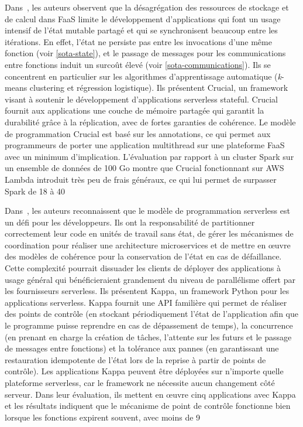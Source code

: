Dans~\cite{Pons2019OnTF}, les auteurs observent que la désagrégation des ressources de stockage et de calcul dans FaaS limite le développement d'applications qui font un usage intensif de l'état mutable partagé et qui se synchronisent beaucoup entre les itérations. En effet, l'état ne persiste pas entre les invocations d'une même fonction (voir \ref{sota-state}), et le passage de messages pour les communications entre fonctions induit un surcoût élevé (voir \ref{sota-communications}). Ils se concentrent en particulier sur les algorithmes d'apprentissage automatique (\textit{k}-means clustering et régression logistique). Ils présentent Crucial, un framework visant à soutenir le développement d'applications serverless stateful. Crucial fournit aux applications une couche de mémoire partagée qui garantit la durabilité grâce à la réplication, avec de fortes garanties de cohérence. Le modèle de programmation Crucial est basé sur les annotations, ce qui permet aux programmeurs de porter une application multithread sur une plateforme FaaS avec un minimum d'implication. L'évaluation par rapport à un cluster Spark sur un ensemble de données de 100 Go montre que Crucial fonctionnant sur AWS Lambda introduit très peu de frais généraux, ce qui lui permet de surpasser Spark de 18 à 40 %

Dans~\cite{zhangKappaProgrammingFramework2020}, les auteurs reconnaissent que le modèle de programmation serverless est un défi pour les développeurs. Ils ont la responsabilité de partitionner correctement leur code en unités de travail sans état, de gérer les mécanismes de coordination pour réaliser une architecture microservices et de mettre en œuvre des modèles de cohérence pour la conservation de l'état en cas de défaillance. Cette complexité pourrait dissuader les clients de déployer des applications à usage général qui bénéficieraient grandement du niveau de parallélisme offert par les fournisseurs serverless. Ils présentent Kappa, un framework Python pour les applications serverless. Kappa fournit une API familière qui permet de réaliser des points de contrôle (en stockant périodiquement l'état de l'application afin que le programme puisse reprendre en cas de dépassement de temps), la concurrence (en prenant en charge la création de tâches, l'attente sur les futurs et le passage de messages entre fonctions) et la tolérance aux pannes (en garantissant une restauration idempotente de l'état lors de la reprise à partir de points de contrôle). Les applications Kappa peuvent être déployées sur n'importe quelle plateforme serverless, car le framework ne nécessite aucun changement côté serveur. Dans leur évaluation, ils mettent en œuvre cinq applications avec Kappa et les résultats indiquent que le mécanisme de point de contrôle fonctionne bien lorsque les fonctions expirent souvent, avec moins de 9 %

